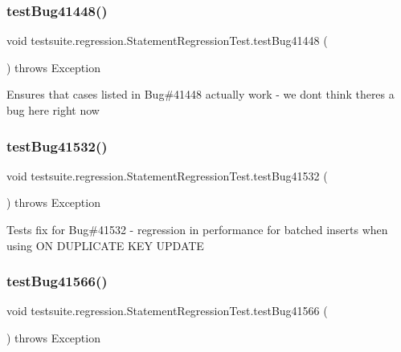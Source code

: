 \subsubsection{\texorpdfstring{test\+Bug41448()}{testBug41448()}}
{\footnotesize\ttfamily void testsuite.\+regression.\+Statement\+Regression\+Test.\+test\+Bug41448 (\begin{DoxyParamCaption}{ }\end{DoxyParamCaption}) throws Exception}

Ensures that cases listed in Bug\#41448 actually work -\/ we don\textquotesingle{}t think there\textquotesingle{}s a bug here right now \mbox{\label{classtestsuite_1_1regression_1_1_statement_regression_test_a793c2353636c4363f1d946e6d1645677}} 
\subsubsection{\texorpdfstring{test\+Bug41532()}{testBug41532()}}
{\footnotesize\ttfamily void testsuite.\+regression.\+Statement\+Regression\+Test.\+test\+Bug41532 (\begin{DoxyParamCaption}{ }\end{DoxyParamCaption}) throws Exception}

Tests fix for Bug\#41532 -\/ regression in performance for batched inserts when using ON D\+U\+P\+L\+I\+C\+A\+TE K\+EY U\+P\+D\+A\+TE \mbox{\label{classtestsuite_1_1regression_1_1_statement_regression_test_aaf0b283354633523bf2979d409cf7c5e}} 
\subsubsection{\texorpdfstring{test\+Bug41566()}{testBug41566()}}
{\footnotesize\ttfamily void testsuite.\+regression.\+Statement\+Regression\+Test.\+test\+Bug41566 (\begin{DoxyParamCaption}{ }\end{DoxyParamCaption}) throws Exception}

